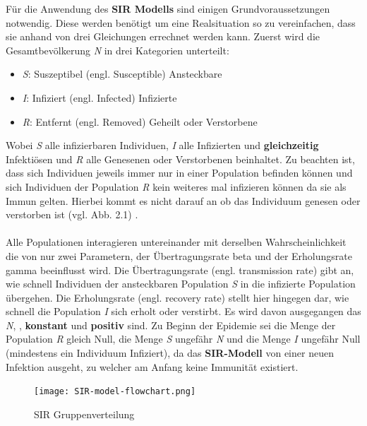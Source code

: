 \documentclass[12pt]{scrartcl} %
\begin{document}
Für die Anwendung des \textbf{SIR Modells} sind einigen Grundvoraussetzungen notwendig. Diese werden benötigt um eine Realsituation so zu vereinfachen, dass sie anhand von drei Gleichungen errechnet werden kann.
Zuerst wird die Gesamtbevölkerung \textit{N} in drei Kategorien unterteilt:

\begin{itemize}
	\item \textit{S}: Suszeptibel (engl. Susceptible) \hfill Ansteckbare
	\item \textit{I}: Infiziert (engl. Infected) \hfill Infizierte
	\item \textit{R}: Entfernt (engl. Removed) \hfill Geheilt oder Verstorbene
\end{itemize}
\normalsize

Wobei \textit{S} alle infizierbaren Individuen, \textit{I} alle Infizierten und \textbf{gleichzeitig} Infektiösen und \textit{R} alle Genesenen oder Verstorbenen beinhaltet.  Zu beachten ist, dass sich Individuen jeweils immer nur in einer Population befinden können und sich Individuen der Population 
\textit{R} kein weiteres mal infizieren können da sie als Immun gelten. Hierbei kommt es nicht darauf an ob das Individuum genesen oder verstorben ist (vgl. Abb. 2.1) \cite{4}.\\
\\
Alle Populationen interagieren untereinander mit derselben Wahrscheinlichkeit die von nur zwei Parametern, der Übertragungsrate beta \textbeta\space und der Erholungsrate gamma \textgamma\space beeinflusst wird.
Die Übertragungsrate \textbeta \space (engl. transmission rate) gibt an, wie schnell Individuen der ansteckbaren Population \textit{S} in die infizierte Population übergehen. 
Die Erholungsrate \textgamma \space (engl. recovery rate) stellt hier hingegen dar, wie schnell die Population \textit{I} sich erholt oder verstirbt.
Es wird davon ausgegangen das \textit{N}, \textbeta, \textgamma \space \textbf{konstant} und \textbf{positiv} sind.
Zu Beginn der Epidemie sei die Menge der Population \textsl{R} gleich Null, die Menge \textsl{S} ungefähr \textit{N} und die Menge \textit{I} ungefähr Null (mindestens ein Individuum Infiziert), da das \textbf{SIR-Modell} von einer neuen Infektion ausgeht, zu welcher am Anfang keine Immunität existiert.

	\begin{figure}[h]
	\centering
	\texttt{[image: SIR-model-flowchart.png]} 
	\caption[SIR Gruppenverteilung,\newline Angepasst von https://www.researchgate.net/figure/SIR-model-flowchart\textunderscore fig8]{SIR Gruppenverteilung}
	\end{figure}
\end{document}
